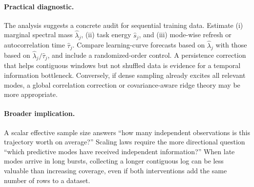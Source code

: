 \paragraph{Practical diagnostic.}
The analysis suggests a concrete audit for sequential training data.  Estimate
(i) marginal spectral mass $\widehat\lambda_j$, (ii) task energy
$\widehat s_j$, and (iii) mode-wise refresh or autocorrelation time
$\widehat\tau_j$.  Compare learning-curve forecasts based on
$\widehat\lambda_j$ with those based on
$\widehat\lambda_j/\widehat\tau_j$, and include a randomized-order control.
A persistence correction that helps contiguous windows but not shuffled data
is evidence for a temporal information bottleneck.  Conversely, if dense
sampling already excites all relevant modes, a global correlation correction
or covariance-aware ridge theory may be more appropriate.

\paragraph{Broader implication.}
A scalar effective sample size answers ``how many independent observations is
this trajectory worth on average?''  Scaling laws require the more directional
question ``which predictive modes have received independent information?''
When late modes arrive in long bursts, collecting a longer contiguous log can
be less valuable than increasing coverage, even if both interventions add the
same number of rows to a dataset.
